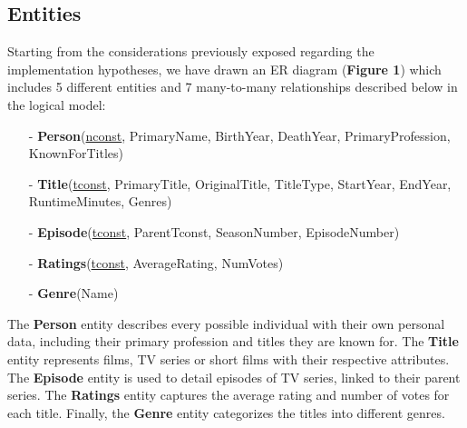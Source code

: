 \documentclass[a4paper,12pt]{article}
\begin{document}
  \subsection{Entities}
\par Starting from the considerations previously exposed regarding the implementation hypotheses, we have drawn an ER diagram (\textbf{Figure 1}) which includes 5 different entities and 7 many-to-many relationships described below in the logical model: \par
  \begin{itemize}[noitemsep]
  \item[-]	\textbf{Person}(\underline{nconst}, PrimaryName, BirthYear, DeathYear, PrimaryProfession, KnownForTitles)
	\item[-]	\textbf{Title}(\underline{tconst}, PrimaryTitle, OriginalTitle, TitleType, StartYear, EndYear, RuntimeMinutes, Genres)
	\item[-]	\textbf{Episode}(\underline{tconst}, ParentTconst, SeasonNumber, EpisodeNumber)
	\item[-]	\textbf{Ratings}(\underline{tconst}, AverageRating, NumVotes)
	\item[-]	\textbf{Genre}(Name)
  \end{itemize} \par
The \textbf{Person} entity describes every possible individual with their own personal data, including their primary profession and titles they are known for. 
The \textbf{Title} entity represents films, TV series or short films with their respective attributes. 
The \textbf{Episode} entity is used to detail episodes of TV series, linked to their parent series. 
The \textbf{Ratings} entity captures the average rating and number of votes for each title. 
Finally, the \textbf{Genre} entity categorizes the titles into different genres.
\end{document}
